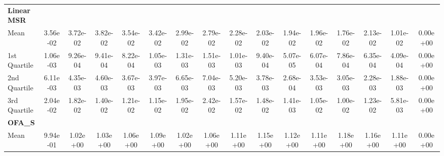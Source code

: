 {\begin{tabular} {lccccccccccccccc}
\addlinespace[1ex] 
\textbf{LinearMSR} &  &  &  &  &  &  &  &  &  &  &  &  &  &  &  \\ 
\hspace{7pt}Mean & \cellcolor{silver!60}3.56e-02 & \cellcolor{silver!60}3.72e-02 & \cellcolor{silver!60}3.82e-02 & \cellcolor{silver!60}3.54e-02 & \cellcolor{silver!60}3.42e-02 & \cellcolor{silver!60}2.99e-02 & \cellcolor{silver!60}2.79e-02 & \cellcolor{silver!60}2.28e-02 & \cellcolor{silver!60}2.03e-02 & \cellcolor{gold!60}1.94e-02 & \cellcolor{silver!60}1.96e-02 & \cellcolor{silver!60}1.76e-02 & \cellcolor{silver!60}2.13e-02 & \cellcolor{silver!60}1.01e-02 & \cellcolor{gold!60}0.00e+00 \\ 
\hspace{7pt}1st Quartile & \cellcolor{silver!60}1.06e-03 & \cellcolor{silver!60}9.26e-04 & \cellcolor{silver!60}9.41e-04 & \cellcolor{silver!60}8.22e-04 & \cellcolor{silver!60}1.05e-03 & \cellcolor{silver!60}1.31e-03 & \cellcolor{silver!60}1.51e-03 & \cellcolor{silver!60}1.01e-03 & \cellcolor{silver!60}9.40e-04 & \cellcolor{gold!60}5.07e-05 & \cellcolor{silver!60}6.07e-04 & \cellcolor{silver!60}7.86e-04 & \cellcolor{silver!60}6.35e-04 & \cellcolor{silver!60}4.09e-04 & \cellcolor{gold!60}0.00e+00 \\ 
\hspace{7pt}2nd Quartile & \cellcolor{silver!60}6.11e-03 & \cellcolor{silver!60}4.35e-03 & \cellcolor{silver!60}4.60e-03 & \cellcolor{silver!60}3.67e-03 & \cellcolor{silver!60}3.97e-03 & \cellcolor{silver!60}6.65e-03 & \cellcolor{silver!60}7.04e-03 & \cellcolor{silver!60}5.20e-03 & \cellcolor{silver!60}3.78e-03 & \cellcolor{gold!60}2.68e-04 & \cellcolor{silver!60}3.53e-03 & \cellcolor{silver!60}3.05e-03 & \cellcolor{silver!60}2.28e-03 & \cellcolor{silver!60}1.88e-03 & \cellcolor{gold!60}0.00e+00 \\ 
\hspace{7pt}3rd Quartile & \cellcolor{silver!60}2.04e-02 & \cellcolor{silver!60}1.82e-02 & \cellcolor{gold!60}1.40e-02 & \cellcolor{gold!60}1.21e-02 & \cellcolor{gold!60}1.15e-02 & \cellcolor{silver!60}1.95e-02 & \cellcolor{silver!60}2.42e-02 & \cellcolor{silver!60}1.57e-02 & \cellcolor{silver!60}1.48e-02 & \cellcolor{gold!60}1.41e-03 & \cellcolor{gold!60}1.05e-02 & \cellcolor{gold!60}1.00e-02 & \cellcolor{silver!60}1.23e-02 & \cellcolor{gold!60}5.81e-03 & \cellcolor{gold!60}0.00e+00 \\ 
\addlinespace[1ex] 
\textbf{OFA_S} &  &  &  &  &  &  &  &  &  &  &  &  &  &  &  \\ 
\hspace{7pt}Mean & 9.94e-01 & 1.02e+00 & 1.03e+00 & 1.06e+00 & 1.09e+00 & 1.02e+00 & 1.06e+00 & 1.11e+00 & 1.15e+00 & 1.12e+00 & 1.11e+00 & 1.18e+00 & 1.16e+00 & 1.11e+00 & \cellcolor{gold!60}0.00e+00 \\ 

\end{tabular}}
